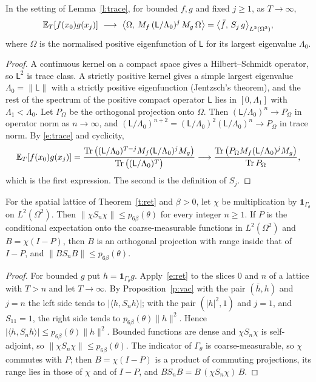 \begin{proposition}\label{p:vac}
In the setting of Lemma~\ref{l:trace}, for bounded $f,g$ and fixed $j\ge1$, as $T\to\infty$,
\[
\E_T[f(x_0)g(x_j)]\ \longrightarrow\ \big\langle\Omega,\,M_f\,(\mathsf L/\Lambda_0)^j\,M_g\,\Omega\big\rangle
=\big\langle\bar f,\,S_j\,g\big\rangle_{L^2(\Omega^2)} ,
\]
where $\Omega$ is the normalised positive eigenfunction of $\mathsf L$ for its largest eigenvalue $\Lambda_0$.
\end{proposition}
\begin{proof}
A continuous kernel on a compact space gives a Hilbert--Schmidt operator, so $\mathsf L^2$ is trace class.
A strictly positive kernel gives a simple largest eigenvalue $\Lambda_0=\|\mathsf L\|$ with a strictly positive
eigenfunction (Jentzsch's theorem), and the rest of the spectrum of the positive compact operator $\mathsf L$
lies in $[0,\Lambda_1]$ with $\Lambda_1<\Lambda_0$. Let $P_\Omega$ be the orthogonal projection onto $\Omega$. Then $(\mathsf L/\Lambda_0)^n\to P_\Omega$ in
operator norm as $n\to\infty$, and $(\mathsf L/\Lambda_0)^{n+2}=(\mathsf L/\Lambda_0)^2(\mathsf L/\Lambda_0)^n\to P_\Omega$ in trace norm. By
\eqref{e:trace} and cyclicity,
\[
\mathbb{E}_T[f(x_0)g(x_j)]=\frac{\operatorname{Tr}\big((\mathsf L/\Lambda_0)^{T-j}M_f(\mathsf L/\Lambda_0)^jM_g\big)}{\operatorname{Tr}\big((\mathsf L/\Lambda_0)^T\big)}
\longrightarrow\frac{\operatorname{Tr}\big(P_\Omega M_f(\mathsf L/\Lambda_0)^jM_g\big)}{\operatorname{Tr} P_\Omega},
\]
which is the first expression. The second is the definition of $S_j$.
\end{proof}

\begin{corollary}\label{c:vac}
For the spatial lattice of Theorem~\ref{t:ret} and $\beta>0$, let $\chi$ be
multiplication by $\mathbf 1_{\Gamma_\theta}$ on $L^2(\Omega^2)$. Then $\|\chi S_n\chi\|\le p_{6\beta}(\theta)$ for every
integer $n\ge1$. If $P$ is the conditional expectation onto the coarse-measurable functions in
$L^2(\Omega^2)$ and $B=\chi(I-P)$, then $B$ is an orthogonal projection with range inside that of $I-P$, and
$\|BS_nB\|\le p_{6\beta}(\theta)$.
\end{corollary}
\begin{proof}
For bounded $g$ put $h=\mathbf 1_{\Gamma_\theta}g$. Apply~\eqref{e:ret} to the slices $0$ and $n$ of a lattice
with $T>n$ and let $T\to\infty$. By Proposition~\ref{p:vac} with the pair $(\bar h,h)$ and $j=n$ the left side
tends to $|\langle h,S_nh\rangle|$; with the pair $(|h|^2,1)$ and $j=1$, and $S_11=1$, the right side tends to
$p_{6\beta}(\theta)\|h\|^2$. Hence $|\langle h,S_nh\rangle|\le p_{6\beta}(\theta)\|h\|^2$. Bounded functions
are dense and $\chi S_n\chi$ is self-adjoint, so $\|\chi S_n\chi\|\le p_{6\beta}(\theta)$. The indicator of $\Gamma_\theta$ is
coarse-measurable, so $\chi$ commutes with $P$; then $B=\chi(I-P)$ is a product of commuting projections, its range
lies in those of $\chi$ and of $I-P$, and $BS_nB=B\,(\chi S_n\chi)\,B$.
\end{proof}

